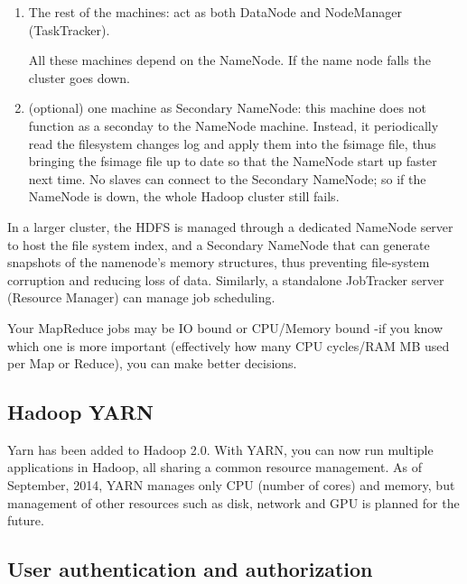 \begin{enumerate}
\begin{itemize}
    Since Hadoop 2.0, a new feature called Secondary NameNode added. What it
    does is to help boosting the start-up time; not as a full replicate of the
    NamaNode.\footnote{\url{http://stackoverflow.com/questions/19970461/name-node-vs-secondary-name-node}}
    
    
  \end{itemize}
  
  \item The rest of the machines: act as both DataNode and NodeManager
  (TaskTracker).
  
  All these machines depend on the NameNode. If the name node falls the cluster
  goes down.
  
  \item (optional) one machine as Secondary NameNode: this machine does not
  function as a seconday to the NameNode machine. Instead,  it periodically read
  the filesystem changes log and apply them into the fsimage file, thus bringing
  the fsimage file up to date so that the NameNode start up faster next time.
  No slaves can connect to the Secondary NameNode; so if the NameNode is down,
  the whole Hadoop cluster still fails.
  
\end{enumerate}
In a larger cluster, the HDFS is managed through a dedicated NameNode server to
host the file system index, and a Secondary NameNode that can generate snapshots
of the namenode's memory structures, thus preventing file-system corruption and
reducing loss of data. Similarly, a standalone JobTracker server (Resource
Manager) can manage job scheduling.


Your MapReduce jobs may be IO bound or CPU/Memory bound -if you know which one
is more important (effectively how many CPU cycles/RAM MB used per Map or
Reduce), you can make better decisions. 


\subsection{Hadoop YARN}
\label{sec:YARN}

Yarn has been added to Hadoop 2.0. 
With YARN, you can now run multiple applications in Hadoop, all sharing a common
resource management.  As of September, 2014, YARN manages only CPU (number of
cores) and memory, but management of other resources such as disk, network
and GPU is planned for the future.



\subsection{User authentication and authorization}

